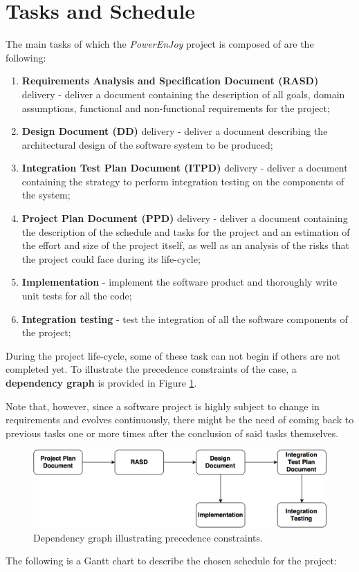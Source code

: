 \section{Tasks and Schedule}
The main tasks of which the \textit{PowerEnJoy} project is composed of are the following:
\begin{enumerate}
\item \textbf{Requirements Analysis and Specification Document (RASD)} delivery - deliver a document containing the description of all goals, domain assumptions, functional and non-functional requirements for the project;
\item \textbf{Design Document (DD)} delivery - deliver a document describing the architectural design of the software system to be produced;
\item \textbf{Integration Test Plan Document (ITPD)} delivery - deliver a document containing the strategy to perform integration testing on the components of the system;
\item \textbf{Project Plan Document (PPD)} delivery - deliver a document containing the description of the schedule and tasks for the project and an estimation of the effort and size of the project itself, as well as an analysis of the risks that the project could face during its life-cycle;
\item \textbf{Implementation} - implement the software product and thoroughly write unit tests for all the code;
\item \textbf{Integration testing} - test the integration of all the software components of the project;
\end{enumerate}

During the project life-cycle, some of these task can not begin if others are not completed yet. To illustrate the precedence constraints of the case, a \textbf{dependency graph} is provided in Figure \ref{dep_dag}.

Note that, however, since a software project is highly subject to change in requirements and evolves continuously, there might be the need of coming back to previous tasks one or more times after the conclusion of said tasks themselves.

\begin{figure}[H]
\begin{center}
		\centerline{\includegraphics[width=\textwidth]{./pictures/dependencies_dag.png}}
		\caption{Dependency graph illustrating precedence constraints.}
		\label{dep_dag}
\end{center}
\end{figure}
\noindent
The following is a Gantt chart to describe the chosen schedule for the project:

